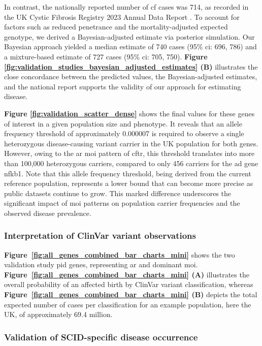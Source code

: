 In contrast, the nationally reported number of \ac{cf} cases was 714, as recorded in the UK Cystic Fibrosis Registry 2023 Annual Data Report
\cite{naito2023uk}. To account for factors such as reduced penetrance and the mortality-adjusted expected genotype, we derived a Bayesian-adjusted estimate via posterior simulation. Our Bayesian approach yielded a median estimate of 740 cases (95\% \ac{ci}: 696, 786) and a mixture-based estimate of 727 cases (95\% \ac{ci}: 705, 750).
\textbf{Figure \ref{fig:validation_studies_bayesian_adjusted_estimates} (B)} illustrates the close concordance between the predicted values, the Bayesian-adjusted estimates, and the national report supports the validity of our approach for estimating disease.


\textbf{Figure \ref{fig:validation_scatter_dense}} shows the final values for these genes of interest in a given population size and phenotype. It reveals that an allele frequency threshold of approximately 0.000007 is required to observe a single heterozygous disease-causing variant carrier in the UK population for both genes. However, owing to the \ac{ar} \ac{moi} pattern of \ac{cftr}, this threshold translates into more than 100,000 heterozygous carriers, compared to only 456 carriers for the \ac{ad} gene \ac{nfkb1}. Note that this allele frequency threshold, being derived from the current reference population, represents a lower bound that can become more precise as public datasets continue to grow. This marked difference underscores the significant impact of \ac{moi} patterns on population carrier frequencies and the observed disease prevalence.




\FloatBarrier
\subsubsection{Interpretation of ClinVar variant observations}

\textbf{Figure~\ref{fig:all_genes_combined_bar_charts_mini}} shows  the two validation study \ac{pid} genes, representing \ac{ar} and dominant \ac{moi}. \textbf{Figure~\ref{fig:all_genes_combined_bar_charts_mini} (A)}   illustrates the overall probability of an affected birth by ClinVar variant classification, whereas \textbf{Figure~\ref{fig:all_genes_combined_bar_charts_mini}  (B)}  depicts the total expected number of cases per classification for an example population, here the UK, of approximately 69.4 million. 

\subsubsection{Validation of SCID-specific disease occurrence}

